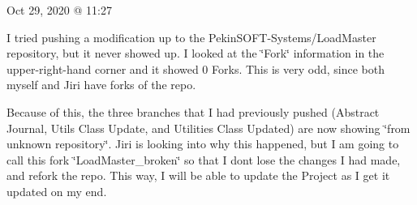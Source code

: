 Oct 29, 2020 @ 11\+:27

I tried pushing a modification up to the Pekin\+S\+O\+F\+T-\/\+Systems/\+Load\+Master repository, but it never showed up. I looked at the \char`\"{}\+Fork\char`\"{} information in the upper-\/right-\/hand corner and it showed 0 Forks. This is very odd, since both myself and Jiri have forks of the repo.

Because of this, the three branches that I had previously pushed ({\ttfamily Abstract Journal}, {\ttfamily Utils Class Update}, and {\ttfamily Utilities Class Updated}) are now showing \char`\"{}from unknown repository\char`\"{}. Jiri is looking into why this happened, but I am going to call this fork \char`\"{}\+Load\+Master\+\_\+broken\char`\"{} so that I don\textquotesingle{}t lose the changes I had made, and refork the repo. This way, I will be able to update the Project as I get it updated on my end. 